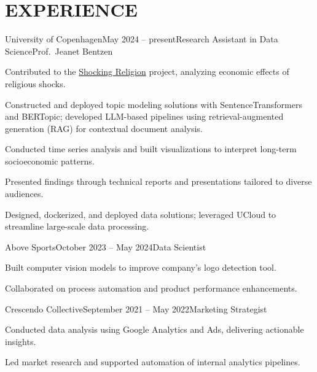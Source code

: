 \documentclass{resume}
\begin{document}
\section{EXPERIENCE}
\begin{content}

    \begin{position}{University of Copenhagen}{May 2024 -- present}{Research Assistant in Data Science}{Prof.~Jeanet Bentzen}{}
    \item Contributed to the {\href{https://www.economics.ku.dk/research/externally-funded-research_new/shocking-religion/}{Shocking Religion}} project, analyzing economic effects of religious shocks.
    \item Constructed and deployed topic modeling solutions with SentenceTransformers and BERTopic; developed LLM-based pipelines using retrieval-augmented generation (RAG) for contextual document analysis.
    \item Conducted time series analysis and built visualizations to interpret long-term socioeconomic patterns.
    \item Presented findings through technical reports and presentations tailored to diverse audiences.
    \item Designed, dockerized, and deployed data solutions; leveraged UCloud to streamline large-scale data processing.
    \end{position}

    \begin{position}{Above Sports}{October 2023 -- May 2024}{Data Scientist}{}{}
    \item Built computer vision models to improve company’s logo detection tool.
    \item Collaborated on process automation and product performance enhancements.
    \end{position}

    \begin{position}{Crescendo Collective}{September 2021 -- May 2022}{Marketing Strategist}{}{}
    \item Conducted data analysis using Google Analytics and Ads, delivering actionable insights.
    \item Led market research and supported automation of internal analytics pipelines.
    \end{position}

\sectionlineskip
\end{content}

\end{document}
